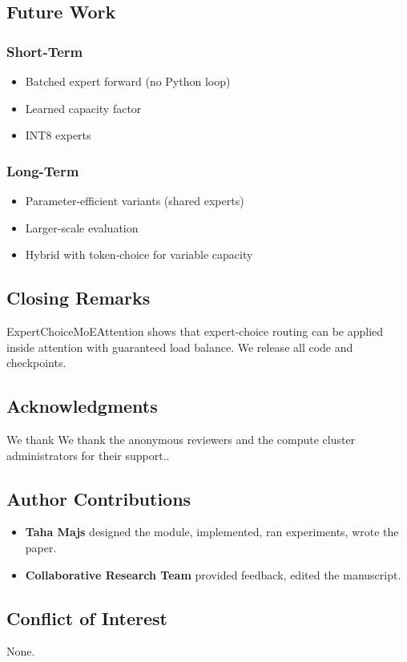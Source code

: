 \subsection{Future Work}

\subsubsection{Short-Term}
\begin{itemize}
\item Batched expert forward (no Python loop)
\item Learned capacity factor
\item INT8 experts

\end{itemize}
\subsubsection{Long-Term}
\begin{itemize}
\item Parameter-efficient variants (shared experts)
\item Larger-scale evaluation
\item Hybrid with token-choice for variable capacity

\end{itemize}
\subsection{Closing Remarks}

ExpertChoiceMoEAttention shows that expert-choice routing can be applied 
inside attention with guaranteed load balance. We release all code and 
checkpoints.

\subsection{Acknowledgments}

We thank We thank the anonymous reviewers and the compute cluster administrators for their support..

\subsection{Author Contributions}

\begin{itemize}
\item \textbf{Taha Majs} designed the module, implemented, ran experiments, wrote
  the paper.
\item \textbf{Collaborative Research Team} provided feedback, edited the manuscript.

\end{itemize}
\subsection{Conflict of Interest}

None.

